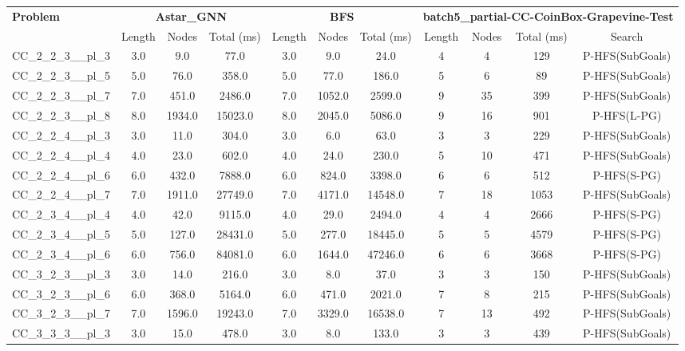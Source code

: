 \begin{table}[!ht]
\centering
\scriptsize
\begin{tabular}{l|ccc|ccc|cccc}
\multirow{2}{*}{\textbf{Problem}} & \multicolumn{3}{c|}{\textbf{Astar\_GNN}} & \multicolumn{3}{c|}{\textbf{BFS}} & \multicolumn{4}{c}{\textbf{batch5\_partial-CC-CoinBox-Grapevine-Test}} \\
\cline{2-11}
& Length & Nodes & Total (ms) & Length & Nodes & Total (ms) & Length & Nodes & Total (ms) & Search \\
\hline
CC\_2\_2\_3\_\_pl\_3 & 3.0 & 9.0 & 77.0 & 3.0 & 9.0 & 24.0 & 4 & 4 & 129 & P-HFS(SubGoals) \\
CC\_2\_2\_3\_\_pl\_5 & 5.0 & 76.0 & 358.0 & 5.0 & 77.0 & 186.0 & 5 & 6 & 89 & P-HFS(SubGoals) \\
CC\_2\_2\_3\_\_pl\_7 & 7.0 & 451.0 & 2486.0 & 7.0 & 1052.0 & 2599.0 & 9 & 35 & 399 & P-HFS(SubGoals) \\
CC\_2\_2\_3\_\_pl\_8 & 8.0 & 1934.0 & 15023.0 & 8.0 & 2045.0 & 5086.0 & 9 & 16 & 901 & P-HFS(L-PG) \\
CC\_2\_2\_4\_\_pl\_3 & 3.0 & 11.0 & 304.0 & 3.0 & 6.0 & 63.0 & 3 & 3 & 229 & P-HFS(SubGoals) \\
CC\_2\_2\_4\_\_pl\_4 & 4.0 & 23.0 & 602.0 & 4.0 & 24.0 & 230.0 & 5 & 10 & 471 & P-HFS(SubGoals) \\
CC\_2\_2\_4\_\_pl\_6 & 6.0 & 432.0 & 7888.0 & 6.0 & 824.0 & 3398.0 & 6 & 6 & 512 & P-HFS(S-PG) \\
CC\_2\_2\_4\_\_pl\_7 & 7.0 & 1911.0 & 27749.0 & 7.0 & 4171.0 & 14548.0 & 7 & 18 & 1053 & P-HFS(SubGoals) \\
CC\_2\_3\_4\_\_pl\_4 & 4.0 & 42.0 & 9115.0 & 4.0 & 29.0 & 2494.0 & 4 & 4 & 2666 & P-HFS(S-PG) \\
CC\_2\_3\_4\_\_pl\_5 & 5.0 & 127.0 & 28431.0 & 5.0 & 277.0 & 18445.0 & 5 & 5 & 4579 & P-HFS(S-PG) \\
CC\_2\_3\_4\_\_pl\_6 & 6.0 & 756.0 & 84081.0 & 6.0 & 1644.0 & 47246.0 & 6 & 6 & 3668 & P-HFS(S-PG) \\
CC\_3\_2\_3\_\_pl\_3 & 3.0 & 14.0 & 216.0 & 3.0 & 8.0 & 37.0 & 3 & 3 & 150 & P-HFS(SubGoals) \\
CC\_3\_2\_3\_\_pl\_6 & 6.0 & 368.0 & 5164.0 & 6.0 & 471.0 & 2021.0 & 7 & 8 & 215 & P-HFS(SubGoals) \\
CC\_3\_2\_3\_\_pl\_7 & 7.0 & 1596.0 & 19243.0 & 7.0 & 3329.0 & 16538.0 & 7 & 13 & 492 & P-HFS(SubGoals) \\
CC\_3\_3\_3\_\_pl\_3 & 3.0 & 15.0 & 478.0 & 3.0 & 8.0 & 133.0 & 3 & 3 & 439 & P-HFS(SubGoals) \\

\end{tabular}
\end{table}
